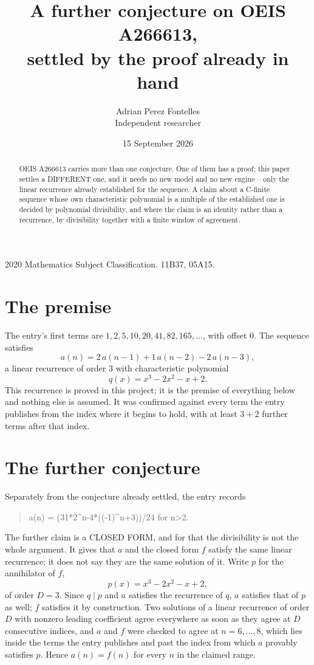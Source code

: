 \documentclass[11pt,a4paper]{article}
\title{A further conjecture on OEIS A266613,\\ \large settled by the proof already in hand}
\author{Adrian Perez Fontelles\\ \small Independent researcher}
\date{15 September 2026}
\theoremstyle{plain}
\theoremstyle{definition}
\begin{document}
\maketitle

\begin{abstract}
OEIS A266613 carries more than one conjecture. One of them has a proof; this paper settles a
DIFFERENT one, and it needs no new model and no new engine -- only the linear recurrence already
established for the sequence. A claim about a C-finite sequence whose own characteristic
polynomial is a multiple of the established one is decided by polynomial divisibility, and where
the claim is an identity rather than a recurrence, by divisibility together with a finite window
of agreement.
\end{abstract}

\noindent\small 2020 Mathematics Subject Classification. 11B37, 05A15.\normalsize

\section{The premise}

The entry's first terms are $1, 2, 5, 10, 20, 41, 82, 165,\dots$, with offset $0$. The sequence satisfies
\[
  a(n)=2\,a(n-1) + 1\,a(n-2) - 2\,a(n-3) ,
\]
a linear recurrence of order $3$ with characteristic polynomial
\[
  q(x)=x^{3} - 2 x^{2} - x + 2 .
\]
This recurrence is proved in this project; it is the premise of everything below and nothing else is assumed.
It was confirmed against every term the entry publishes from the index where it begins to hold,
with at least $3+2$ further terms after that index.

\section{The further conjecture}

Separately from the conjecture already settled, the entry records

\begin{quote}\raggedright a(n) = (31*2\^{}n-4*((-1)\^{}n+3))/24 for n>2.\end{quote}

The further claim is a CLOSED FORM, and for that the divisibility is not the whole argument. It
gives that $a$ and the closed form $f$ satisfy the same linear recurrence; it does not say they
are the same solution of it. Write $p$ for the annihilator of $f$,
\[
  p(x)=x^{3} - 2 x^{2} - x + 2 ,
\]
of order $D=3$. Since $q\mid p$ and $a$ satisfies the recurrence of $q$, $a$ satisfies that of
$p$ as well; $f$ satisfies it by construction. Two solutions of a linear recurrence of order $D$
with nonzero leading coefficient agree everywhere as soon as they agree at $D$ consecutive
indices, and $a$ and $f$ were checked to agree at $n=6,\dots,8$,
which lies inside the terms the entry publishes and past the index from which $a$ provably
satisfies $p$. Hence $a(n)=f(n)$ for every $n$ in the claimed range.
\end{document}
